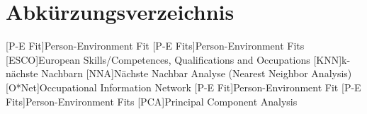 \renewcommand{\chaptermark}[1]{\markboth{\spacedlowsmallcaps{#1}}{\spacedlowsmallcaps{#1}}}
\renewcommand{\sectionmark}[1]{\markright{\thesection\enspace\spacedlowsmallcaps{#1}}}
\chapter*{Abk\"{u}rzungsverzeichnis}

\begin{acronym}[UML]
  [P-E Fit]{Person-Environment Fit}
  [P-E Fits]{Person-Environment Fits}
  [ESCO]{European Skills/Competences, Qualifications and Occupations}
  [KNN]{k-nächste Nachbarn}
  [NNA]{Nächste Nachbar Analyse (Nearest Neighbor Analysis)}
  [O*Net]{Occupational Information Network}
  [P-E Fit]{Person-Environment Fit}
  [P-E Fits]{Person-Environment Fits}
  [PCA]{Principal Component Analysis}
\end{acronym}

\cleardoublepage
